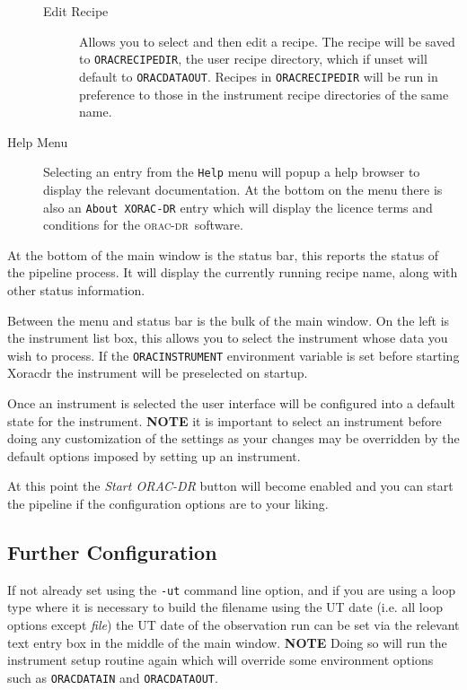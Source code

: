\documentclass[twoside,11pt]{article}
\renewcommand{\_}{\texttt{\symbol{95}}}
\newcommand{\oracdr}{\textsc{orac-dr}}
\begin{document}
\begin{description}
\begin{description}
\item[Edit Recipe] \mbox{}

Allows you to select and then edit a recipe. The recipe will be saved
to \texttt{ORAC\_RECIPE\_DIR}, the user recipe directory, which if unset will
default to \texttt{ORAC\_DATA\_OUT}. Recipes in \texttt{ORAC\_RECIPE\_DIR} will be run
in preference to those in the instrument recipe directories of the
same name.

\end{description}
\item[Help Menu] \mbox{}

Selecting an entry from the \texttt{Help} menu will popup a help browser to
display the relevant documentation. At the bottom on the menu there is
also an \texttt{About XORAC-DR} entry which will display the licence terms
and conditions for the \oracdr\ software.

\end{description}


At the bottom of the main window is the status bar, this reports the
status of the pipeline process. It will display the currently running
recipe name, along with other status information.



Between the menu and status bar is the bulk of the main window. On the
left is the instrument list box, this allows you to select the
instrument whose data you wish to process. If the \texttt{ORAC\_INSTRUMENT}
environment variable is set before starting Xoracdr the instrument
will be preselected on startup.



Once an instrument is selected the user interface will be configured
into a default state for the instrument. \textbf{NOTE} it is important to
select an instrument before doing any customization of the settings as
your changes may be overridden by the default options imposed by
setting up an instrument.



At this point the \textit{Start ORAC-DR} button will become enabled and you
can start the pipeline if the configuration options are to your
liking.

\subsection*{Further Configuration\label{Xoracdr_FURTHER_CONFIGURATION}}

If not already set using the \texttt{-ut} command line option, and if you
are using a loop type where it is necessary to build the filename
using the UT date (i.e. all loop options except \textit{file}) the UT date
of the observation run can be set via the relevant text entry box in
the middle of the main window. \textbf{NOTE} Doing so will run the
instrument setup routine again which will override some environment
options such as \texttt{ORAC\_DATA\_IN} and \texttt{ORAC\_DATA\_OUT}.
\end{document}
